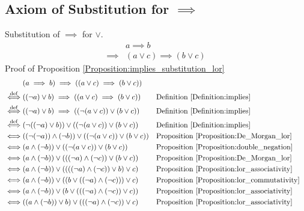 \subsection{Axiom of Substitution for $\implies$}
\begin{prop}
\label{Proposition:implies_substitution_lor}
Substitution of $\implies$ for $\lor$.
\begin{align*}
& a \implies b \\
\implies & (a \lor c) \implies (b \lor c)
\end{align*}
Proof of Proposition \ref{Proposition:implies_substitution_lor}
\begin{align*}
& (a \implies b) \implies ((a \lor c) \implies (b \lor c)) \\
\overset{\operatorname{def}}{\iff} & ((\lnot a) \lor b) \implies ((a \lor c) \implies (b \lor c))
& & \text{Definition \ref{Definition:implies}} \\
\overset{\operatorname{def}}{\iff} & ((\lnot a) \lor b) \implies ((\lnot (a \lor c)) \lor (b \lor c))
& & \text{Definition \ref{Definition:implies}} \\
\overset{\operatorname{def}}{\iff} & (\lnot ((\lnot a) \lor b)) \lor ((\lnot (a \lor c)) \lor (b \lor c))
& & \text{Definition \ref{Definition:implies}} \\
\iff & ((\lnot (\lnot a)) \land (\lnot b)) \lor ((\lnot (a \lor c)) \lor (b \lor c))
& & \text{Proposition \ref{Proposition:De_Morgan_lor}} \\
\iff & (a \land (\lnot b)) \lor ((\lnot (a \lor c)) \lor (b \lor c))
& & \text{Proposition \ref{Proposition:double_negation}} \\
\iff & (a \land (\lnot b)) \lor (((\lnot a) \land (\lnot c)) \lor (b \lor c))
& & \text{Proposition \ref{Proposition:De_Morgan_lor}} \\
\iff & (a \land (\lnot b)) \lor ((((\lnot a) \land (\lnot c)) \lor b) \lor c)
& & \text{Proposition \ref{Proposition:lor_associativity}} \\
\iff & (a \land (\lnot b)) \lor ((b \lor ((\lnot a) \land (\lnot c))) \lor c)
& & \text{Proposition \ref{Proposition:lor_commutativity}} \\
\iff & (a \land (\lnot b)) \lor (b \lor (((\lnot a) \land (\lnot c)) \lor c))
& & \text{Proposition \ref{Proposition:lor_associativity}} \\
\iff & ((a \land (\lnot b)) \lor b) \lor (((\lnot a) \land (\lnot c)) \lor c)
& & \text{Proposition \ref{Proposition:lor_associativity}} \\

\end{align*}
\end{prop}
